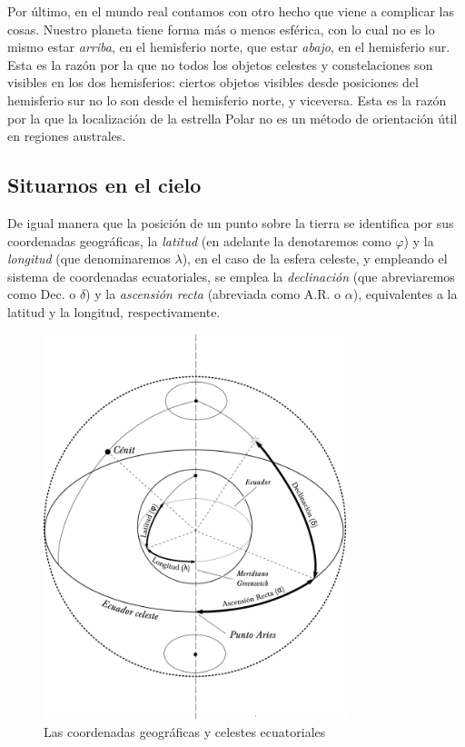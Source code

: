 \documentclass[11pt,a5paper,twoside]{amsbook}
\begin{document}
Por último, en el mundo real contamos con otro hecho que viene a complicar las cosas. Nuestro planeta tiene forma más o menos esférica, con lo cual no es lo mismo estar \textit{arriba}, en el hemisferio norte, que estar \textit{abajo}, en el hemisferio sur. Esta es la razón por la que no todos los objetos celestes y constelaciones son visibles en los dos hemisferios: ciertos objetos visibles desde posiciones del hemisferio sur no lo son desde el hemisferio norte, y viceversa. Esta es la razón por la que la localización de la estrella Polar no es un método de orientación útil en regiones australes.

\subsection{Situarnos en el cielo}

De igual manera que la posición de un punto sobre la tierra se identifica por sus coordenadas geográficas, la \textit{latitud} (en adelante la denotaremos como $\varphi$) y la \textit{longitud} (que denominaremos $\lambda$), en el caso de la esfera celeste, y empleando el sistema de coordenadas ecuatoriales, se emplea la \textit{declinación} (que abreviaremos como Dec. o $\delta$) y la \textit{ascensión recta} (abreviada como A.R. o $\alpha$), equivalentes a la latitud y la longitud, respectivamente.

\begin{figure}[ht]
 \centering
 \includegraphics[width=250pt,keepaspectratio=true]{./coordenadas.png}
 \caption{Las coordenadas geográficas y celestes ecuatoriales}
 \label{coordenadas}
\end{figure}
\end{document}
